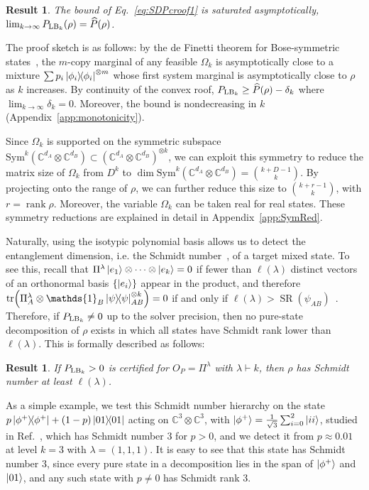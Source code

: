 \documentclass[aps,pra,twocolumn,showpacs,superscriptaddress,groupedaddress]{revtex4-2}
\newcommand{\one}[0]{\mathds{1}}
\newcommand{\C}{\mathds{C}}
\newtheorem{result}    [theorem]{Result}
\begin{document}
\begin{result}\label{thm:ConvergenceSDPcroof}
The bound of Eq.~\eqref{eq:SDPcroof1} is saturated asymptotically, $\lim_{k\rightarrow\infty} P_{{\rm LB}_k}(\rho) = \widehat{P}(\rho)$.
\end{result}
The proof sketch is as follows: by the de Finetti theorem for Bose-symmetric states~\cite{caves2002unknown,Christandl_2007}, the $m$-copy marginal of any feasible $\Omega_k$ is asymptotically close to a mixture $\sum p_i \dyad{\phi_i}^{\otimes m}$ whose first system marginal is asymptotically close to $\rho$ as $k$ increases. By continuity of the convex roof, $P_{{\rm LB}_k} \geq \widehat{P}(\rho) - \delta_k$ where $\lim_{k\to \infty}\delta_k=0$. Moreover, the bound is nondecreasing in $k$ (Appendix~\ref{app:monotonicity}).

Since $\Omega_k$ is supported on the symmetric subspace $\text{Sym}^k(\C^{d_A}\otimes\C^{d_B})\subset(\C^{d_A}\otimes\C^{d_B})^{\otimes k}$, we can exploit this symmetry to reduce the matrix size of $\Omega_k$ from $D^{k}$ to $\dim \text{Sym}^k(\C^{d_A}\otimes\C^{d_B}) = \binom{k+D-1}{k}$. By projecting onto the range of $\rho$, we can further reduce this size to $\binom{k+r-1}{k}$, with $r=\operatorname{rank}\rho$. Moreover, the variable $\Omega_k$ can be taken real for real states. These symmetry reductions are explained in detail in Appendix~\ref{app:SymRed}.

Naturally, using the isotypic polynomial basis allows us to detect the entanglement dimension, i.e. the Schmidt number~\cite{Terhal_2000}, of a target mixed state. To see this, recall that $\Pi^\lambda\ket{e_1}\otimes\dots\otimes\ket{e_k}=0$ if fewer than $\ell(\lambda)$ distinct vectors of an orthonormal basis $\{\ket{e_i}\}$ appear in the product, and therefore $\tr(\Pi^\lambda_A\otimes\one_B \dyad{\psi}_{AB}^{\otimes k}) = 0$ if and only if $\ell(\lambda) > \operatorname{SR}(\psi_{AB})$~\cite{Christandl_2005,lovitz2026TreeTNtest}.
Therefore, if $P_{{\rm LB}_k}\neq 0$ up to the solver precision, then no pure-state decomposition of $\rho$ exists in which all states have Schmidt rank lower than $\ell(\lambda)$. This is formally described as follows:
\begin{result}
   If $P_{{\rm LB}_k}> 0$ is certified for $O_P=\Pi^\lambda$ with $\lambda\vdash k$, then $\rho$ has Schmidt number at least $\ell(\lambda)$.
\end{result}
As a simple example, we test this Schmidt number hierarchy on the state $p \dyad{\phi^+} + (1-p)\dyad{01}$ acting on $\C^3 \otimes \C^3$, with $\ket{\phi^+}=\frac{1}{\sqrt3}\sum_{i=0}^{2}\ket{ii}$, studied in Ref.~\cite{Tavakoli_2024}, which has Schmidt number $3$ for $p > 0$, and we detect it from $p\approx 0.01$ at level $k=3$ with $\lambda = (1,1,1)$. It is easy to see that this state has Schmidt number 3, since every pure state in a decomposition lies in the span of $\ket{\phi^+}$ and $\ket{01}$, and any such state with $p\neq 0$ has Schmidt rank 3.
\end{document}

